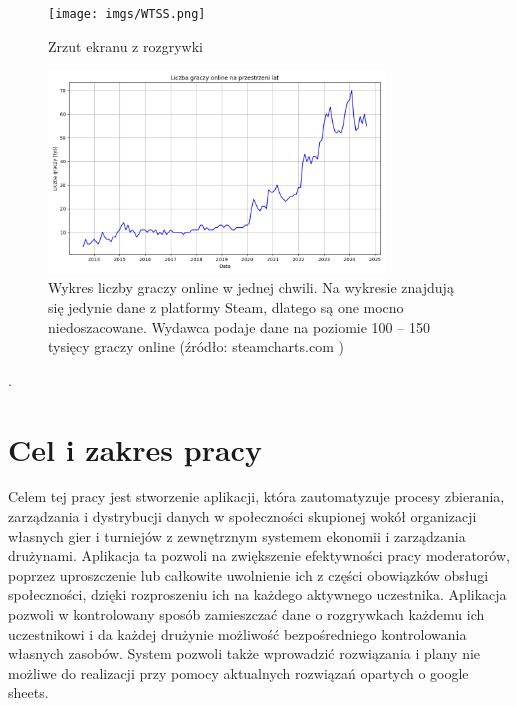     \begin{figure}
        \centering
        \texttt{[image: imgs/WTSS.png]}
        \caption{Zrzut ekranu z rozgrywki}
    \end{figure}

    \begin{figure}
        \centering
        \includegraphics[width=0.8\textwidth]{imgs/wykres_graczy.png}
        \caption{Wykres liczby graczy online w jednej chwili.
            Na wykresie znajdują się jedynie dane z platformy Steam, dlatego są one mocno niedoszacowane. Wydawca podaje dane na poziomie 100 – 150 tysięcy graczy online
            (źródło: steamcharts.com \cite{StCh01})}
    \end{figure}

.

    \newpage


    \section{Cel i zakres pracy }
    \label{sec:celePracy}

    	Celem tej pracy jest stworzenie aplikacji, która zautomatyzuje procesy zbierania, zarządzania i dystrybucji danych w społeczności skupionej wokół organizacji własnych gier i turniejów z zewnętrznym systemem ekonomii i zarządzania drużynami. Aplikacja ta pozwoli na zwiększenie efektywności pracy moderatorów, poprzez uproszczenie lub całkowite uwolnienie ich z części obowiązków obsługi społeczności, dzięki rozproszeniu ich na każdego aktywnego uczestnika. Aplikacja pozwoli w kontrolowany sposób zamieszczać dane o rozgrywkach każdemu ich uczestnikowi i da każdej drużynie możliwość bezpośredniego kontrolowania własnych zasobów. System pozwoli także wprowadzić rozwiązania i plany nie możliwe do realizacji przy pomocy aktualnych rozwiązań opartych o google sheets.\\

